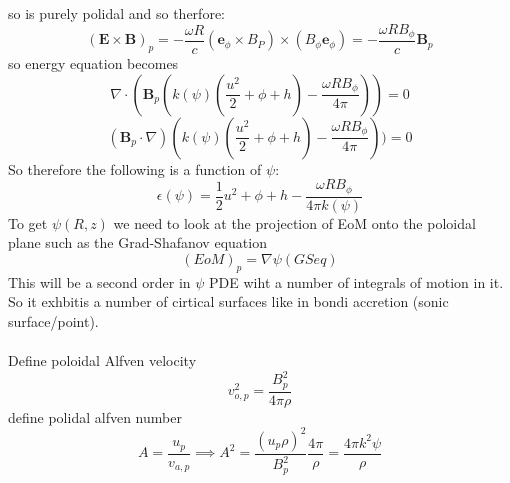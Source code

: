 \documentclass{article}
\begin{document}
so is purely polidal and so therfore:
$$
(\bm E \times \bm B)_p = - \frac{\omega R}{c} (\bm e_{\phi} \times B_P) \times (B_{\phi}\bm e_{\phi}) = - \frac{\omega R B_{\phi}}{c} \bm B_p
$$
so energy equation becomes
$$
\nabla \cdot (\bm B_p (k(\psi) (\frac{u^2}{2} + \phi + h) - \frac{\omega R B_{\phi}}{4\pi})) = 0
$$
$$
(\bm B_p \cdot \nabla) (k(\psi) (\frac{u^2}{2} + \phi + h) - \frac{\omega RB_{\phi}}{4 \pi})) = 0
$$
So therefore the following is a function of $\psi$:
$$
\epsilon( \psi) = \frac{1}{2} u^2 + \phi + h - \frac{\omega R B_{\phi}}{4 \pi k(\psi)}
$$
To get $\psi(R,z)$ we need to look at the projection of EoM onto the poloidal plane such as the Grad-Shafanov equation
$$
(EoM)_p = \nabla \psi( GS eq)
$$
This will be a second order in $\psi$ PDE wiht a number of integrals of motion in it. So it exhbitis a number of cirtical surfaces like in bondi accretion (sonic surface/point). \\\\
Define poloidal Alfven velocity
$$
v^2_{o,p} = \frac{B_p^2}{4 \pi \rho}
$$
define polidal alfven number
$$
A = \frac{u_p}{v_{a,p}} \implies A^2 = \frac{ (u_p \rho)^2}{B_p^2} \frac{4\pi}{\rho} = \frac{4 \pi k^2{\psi}}{\rho}
$$
\end{document}
